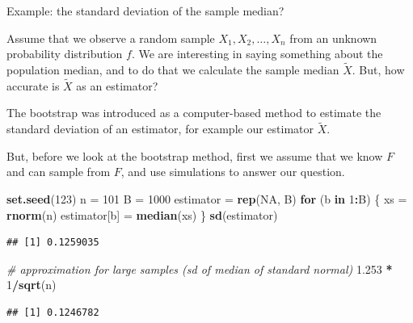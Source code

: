 \documentclass[10pt,ignorenonframetext,]{beamer}
\newenvironment{Shaded}{\begin{snugshade}}{\end{snugshade}}
\newcommand{\KeywordTok}[1]{\textcolor[rgb]{0.13,0.29,0.53}{\textbf{#1}}}
\newcommand{\DecValTok}[1]{\textcolor[rgb]{0.00,0.00,0.81}{#1}}
\newcommand{\FloatTok}[1]{\textcolor[rgb]{0.00,0.00,0.81}{#1}}
\newcommand{\StringTok}[1]{\textcolor[rgb]{0.31,0.60,0.02}{#1}}
\newcommand{\CommentTok}[1]{\textcolor[rgb]{0.56,0.35,0.01}{\textit{#1}}}
\newcommand{\OtherTok}[1]{\textcolor[rgb]{0.56,0.35,0.01}{#1}}
\newcommand{\ControlFlowTok}[1]{\textcolor[rgb]{0.13,0.29,0.53}{\textbf{#1}}}
\newcommand{\OperatorTok}[1]{\textcolor[rgb]{0.81,0.36,0.00}{\textbf{#1}}}
\newcommand{\NormalTok}[1]{#1}
\begin{document}
\begin{frame}

\begin{block}{Example: the standard deviation of the sample median?}

Assume that we observe a random sample \(X_1, X_2, \ldots, X_n\) from an
unknown probability distribution \(f\). We are interesting in saying
something about the population median, and to do that we calculate the
sample median \(\tilde{X}\). But, how accurate is \(\tilde{X}\) as an
estimator?

The bootstrap was introduced as a computer-based method to estimate the
standard deviation of an estimator, for example our estimator
\(\tilde{X}\).

But, before we look at the bootstrap method, first we assume that we
know \(F\) and can sample from \(F\), and use simulations to answer our
question.

\end{block}

\end{frame}

\begin{frame}[fragile]

\begin{Shaded}
\begin{Highlighting}[]
\KeywordTok{set.seed}\NormalTok{(}\DecValTok{123}\NormalTok{)}
\NormalTok{n =}\StringTok{ }\DecValTok{101}
\NormalTok{B =}\StringTok{ }\DecValTok{1000}
\NormalTok{estimator =}\StringTok{ }\KeywordTok{rep}\NormalTok{(}\OtherTok{NA}\NormalTok{, B)}
\ControlFlowTok{for}\NormalTok{ (b }\ControlFlowTok{in} \DecValTok{1}\OperatorTok{:}\NormalTok{B) \{}
\NormalTok{    xs =}\StringTok{ }\KeywordTok{rnorm}\NormalTok{(n)}
\NormalTok{    estimator[b] =}\StringTok{ }\KeywordTok{median}\NormalTok{(xs)}
\NormalTok{\}}
\KeywordTok{sd}\NormalTok{(estimator)}
\end{Highlighting}
\end{Shaded}

\begin{verbatim}
## [1] 0.1259035
\end{verbatim}

\begin{Shaded}
\begin{Highlighting}[]
\CommentTok{# approximation for large samples (sd of median of standard normal)}
\FloatTok{1.253} \OperatorTok{*}\StringTok{ }\DecValTok{1}\OperatorTok{/}\KeywordTok{sqrt}\NormalTok{(n)}
\end{Highlighting}
\end{Shaded}

\begin{verbatim}
## [1] 0.1246782
\end{verbatim}

\end{frame}
\end{document}
